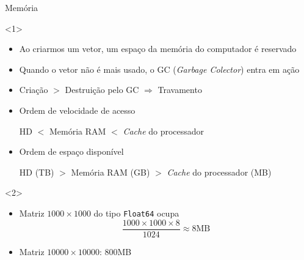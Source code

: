\documentclass[]{beamer}
\newcommand{\code}[1]{\colorbox[gray]{0.8}{\texttt{#1}}}
\begin{document}
\begin{frame}{Memória}

  \begin{onlyenv}<1>
    \begin{itemize}
    \item Ao criarmos um vetor, um espaço da memória do computador é
      reservado
    \item Quando o vetor não é mais usado, o GC (\textit{Garbage
        Colector}) entra em ação
    \item Criação $>$ Destruição pelo GC $\Rightarrow$ Travamento
    \item Ordem de velocidade de acesso
      \begin{center}
        HD $<$ Memória RAM $<$ \emph{Cache} do processador
      \end{center}
    \item Ordem de espaço disponível
      \begin{center}
        HD (TB) $>$ Memória RAM (GB) $>$ \emph{Cache} do processador
        (MB)
      \end{center}
    \end{itemize}
  \end{onlyenv}

  \begin{onlyenv}<2>
    \begin{itemize}
    \item Matriz $1000\times 1000$ do tipo \code{Float64} ocupa
      \[
      \frac{1000 \times 1000 \times 8}{1024} \approx 8\text{MB}
      \]

    \item Matriz $10000 \times 10000$: 800MB

    \end{itemize}
  \end{onlyenv}

\end{frame}
\end{document}
